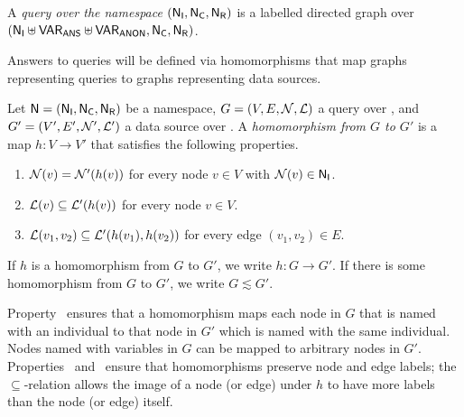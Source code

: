 \begin{definition}
  A \emph{query over the namespace $(\mathsf{N}_\mathsf{I},\mathsf{N}_\mathsf{C},\mathsf{N}_\mathsf{R})$} is a labelled directed graph
  over $(\mathsf{N}_\mathsf{I} \uplus \mathsf{VAR}_\mathsf{ANS} \uplus \mathsf{VAR}_\mathsf{ANON}, \mathsf{N}_\mathsf{C}, \mathsf{N}_\mathsf{R})$.
\end{definition}
%
%
Answers to queries will be defined via homomorphisms that map graphs representing queries
to graphs representing data sources.
%
\begin{definition}
  Let $\textup{\textsf{N}}=(\mathsf{N}_\mathsf{I},\mathsf{N}_\mathsf{C},\mathsf{N}_\mathsf{R})$ be a namespace, $G = (V,E,\mathcal{N},\mathcal{L})$ a query over \namespace,
  and $G' = (V',E',\mathcal{N}',\mathcal{L}')$ a data source over \namespace.
  A \emph{homomorphism from $G$ to $G'$} is a map $h : V \to V'$ that satisfies the following properties.
  \begin{enumerate}
    \item[\hmph{1}]
      $\mathcal{N}(v) = \mathcal{N}'(h(v))$ for every node $v \in V$ with $\mathcal{N}(v) \in \mathsf{N}_\mathsf{I}$.
    \item[\hmph{2}]
      $\mathcal{L}(v) \subseteq \mathcal{L}'(h(v))$ for every node $v \in V$.
    \item[\hmph{3}]
      $\mathcal{L}(v_1, v_2) \subseteq \mathcal{L}'(h(v_1), h(v_2))$
      for every edge $(v_1,v_2) \in E$.
  \end{enumerate}
  If $h$ is a homomorphism from $G$ to $G'$, we write $h : G \to G'$.
  If there is some homomorphism from $G$ to $G'$, we write $G \lesssim G'$.
\end{definition}
%
Property~ ensures that a homomorphism maps each node in $G$ that is named with an individual
to that node in $G'$ which is named with the same individual.
Nodes named with variables in $G$ can be mapped to arbitrary nodes in $G'$.
Properties~ and~ ensure that homomorphisms preserve node and edge labels;
the $\subseteq$-relation allows the image of a node (or edge) under $h$ to have more labels
than the node (or edge) itself.

